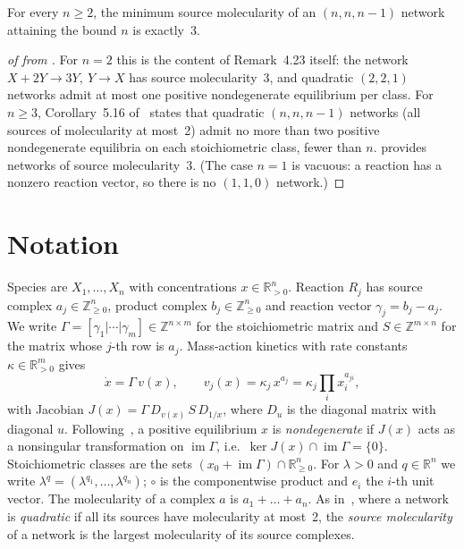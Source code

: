 \documentclass[11pt,a4paper]{report}
\providecommand{\im}{\operatorname{im}}
\begin{document}
\begin{corollary}\label{cor:B}
For every \(n\ge2\), the minimum source molecularity of an \((n,n,n-1)\) network attaining the bound \(n\) is
exactly~3.
\end{corollary}

\begin{proof}[of  from ]
For \(n=2\) this is the content of Remark~4.23 itself: the network \(X+2Y\to3Y,\ Y\to X\) has source molecularity~3,
and quadratic \((2,2,1)\) networks admit at most one positive nondegenerate equilibrium per class. For \(n\ge3\),
Corollary~5.16 of~\autocite{BanajiFeliu2026} states that quadratic \((n,n,n-1)\) networks (all sources of
molecularity at most~2) admit no more than two positive nondegenerate equilibria on each stoichiometric class, fewer
than \(n\).  provides networks of source molecularity~3. (The case \(n=1\) is vacuous: a reaction
has a nonzero reaction vector, so there is no \((1,1,0)\) network.)
\end{proof}

\section{Notation}

Species are \(X_1,\dots,X_n\) with concentrations \(x\in\mathbb R^n_{>0}\). Reaction \(R_j\) has source complex
\(a_j\in\mathbb Z^n_{\ge0}\), product complex \(b_j\in\mathbb Z^n_{\ge0}\) and reaction vector \(\gamma_j=b_j-a_j\). We
write \(\Gamma=[\gamma_1|\cdots|\gamma_m]\in\mathbb Z^{n\times m}\) for the stoichiometric matrix and
\(S\in\mathbb Z^{m\times n}\) for the matrix whose \(j\)-th row is \(a_j\). Mass-action kinetics with rate constants
\(\kappa\in\mathbb R^m_{>0}\) gives
\[
\dot x=\Gamma\, v(x),\qquad v_j(x)=\kappa_j\,x^{a_j}=\kappa_j\prod_i x_i^{a_{ji}},
\]
with Jacobian \(J(x)=\Gamma\,D_{v(x)}\,S\,D_{1/x}\), where \(D_u\) is the diagonal matrix with diagonal \(u\).
Following~\autocite[§2]{BanajiFeliu2026}, a positive equilibrium \(x\) is \emph{nondegenerate} if \(J(x)\) acts as a
nonsingular transformation on \(\im\Gamma\), i.e.\ \(\ker J(x)\cap\im\Gamma=\{0\}\). Stoichiometric classes are the
sets \((x_0+\im\Gamma)\cap\mathbb R^n_{\ge0}\). For \(\lambda>0\) and \(q\in\mathbb R^n\) we write
\(\lambda^q=(\lambda^{q_1},\dots,\lambda^{q_n})\); \(\circ\) is the componentwise product and \(e_i\) the \(i\)-th unit
vector. The molecularity of a complex \(a\) is \(a_1+\dots+a_n\). As in~\autocite{BanajiFeliu2026}, where a network is
\emph{quadratic} if all its sources have molecularity at most~2, the \emph{source molecularity} of a network is the
largest molecularity of its source complexes.
\end{document}
